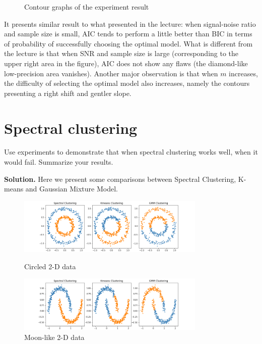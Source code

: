 \documentclass[12pt,a4paper,UTF8,fntef]{article}
\begin{document}
\begin{figure}[htbp]
	\caption{Contour graphs of the experiment result}\label{fig:contour}
\end{figure}

It presents similar result to what presented in the lecture: when signal-noise ratio and sample size is small, AIC tends to perform a little better than BIC in terms of probability of successfully choosing the optimal model. What is different from the lecture is that when SNR and sample size is large (corresponding to the upper right area in the figure), AIC does not show any flaws (the diamond-like low-precision area vanishes). Another major observation is that when $m$ increases, the difficulty of selecting the optimal model also increases, namely the contours presenting a right shift and gentler slope. 
\section{Spectral clustering}
Use experiments to demonstrate that when spectral clustering works well, when it would fail. Summarize your results.

\textbf{Solution.} Here we present some comparisons between Spectral Clustering, K-means and Gaussian Mixture Model.
\begin{figure}[htbp]
	\centering
	\includegraphics[width=0.8\textwidth]{figure/spectral_clustering_circle.png}
	\caption{Circled 2-D data}\label{fig:circle}
	
	\includegraphics[width=0.8\textwidth]{figure/spectral_clustering_moon.png}
	\caption{Moon-like 2-D data}\label{fig:moon}
\end{figure}
\end{document}
